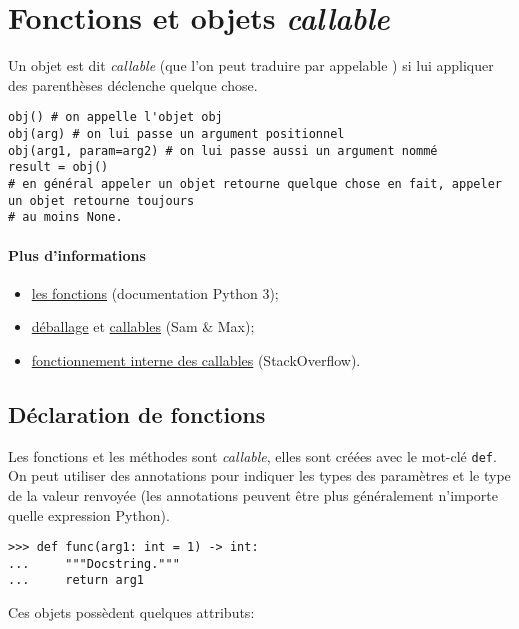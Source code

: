 \section{Fonctions et objets {\normalfont\bfseries\itshape callable}}
Un objet est dit \textit{callable} (que l'on peut traduire par \og appelable \fg{}) si lui appliquer des parenthèses déclenche quelque chose.

\begin{verbatim}
obj() # on appelle l'objet obj
obj(arg) # on lui passe un argument positionnel
obj(arg1, param=arg2) # on lui passe aussi un argument nommé
result = obj() 
# en général appeler un objet retourne quelque chose en fait, appeler un objet retourne toujours
# au moins None.
\end{verbatim}

\paragraph*{Plus d'informations}
\begin{itemize}
    \item \href{https://docs.python.org/3/reference/datamodel.html\#index-32}{les fonctions} (documentation Python 3);
    \item \href{http://sametmax.com/quest-ce-que-lunpacking-en-python-et-a-quoi-ca-sert/}{déballage} et \href{http://sametmax.com/quest-ce-quun-callable-en-python/}{callables} (Sam \& Max);
    \item \href{https://stackoverflow.com/a/32856533/9214306}{fonctionnement interne des callables} (StackOverflow).
\end{itemize}

\subsection{Déclaration de fonctions}

Les fonctions et les méthodes sont \textit{callable}, elles sont créées avec le mot-clé \texttt{def}. On
peut utiliser des annotations pour indiquer les types des paramètres et le type de la valeur renvoyée (les annotations
peuvent être plus généralement n'importe quelle expression Python).

\begin{verbatim}
>>> def func(arg1: int = 1) -> int:
...     """Docstring."""
...     return arg1
\end{verbatim}

Ces objets possèdent quelques attributs:

